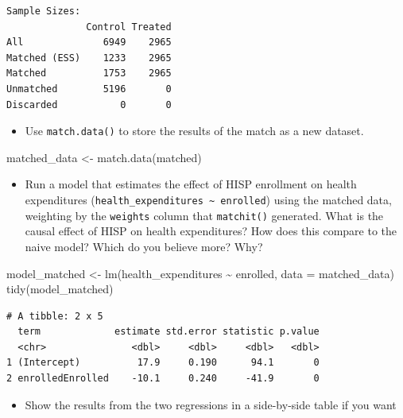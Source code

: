 \documentclass[
  letterpaper,
  DIV=11,
  numbers=noendperiod]{scrartcl}
\newenvironment{Shaded}{\begin{snugshade}}{\end{snugshade}}
\newcommand{\AttributeTok}[1]{\textcolor[rgb]{0.40,0.45,0.13}{#1}}
\newcommand{\FunctionTok}[1]{\textcolor[rgb]{0.28,0.35,0.67}{#1}}
\newcommand{\NormalTok}[1]{\textcolor[rgb]{0.00,0.23,0.31}{#1}}
\newcommand{\OtherTok}[1]{\textcolor[rgb]{0.00,0.23,0.31}{#1}}
\newcommand{\SpecialCharTok}[1]{\textcolor[rgb]{0.37,0.37,0.37}{#1}}
\providecommand{\tightlist}{%
  \setlength{\itemsep}{0pt}\setlength{\parskip}{0pt}}\usepackage{longtable,booktabs,array}
\begin{document}
\begin{verbatim}
Sample Sizes:
              Control Treated
All              6949    2965
Matched (ESS)    1233    2965
Matched          1753    2965
Unmatched        5196       0
Discarded           0       0
\end{verbatim}

\begin{itemize}
\tightlist
\item
  Use \texttt{match.data()} to store the results of the match as a new
  dataset.
\end{itemize}

\begin{Shaded}
\begin{Highlighting}[numbers=left,,]
\NormalTok{matched\_data }\OtherTok{\textless{}{-}} \FunctionTok{match.data}\NormalTok{(matched)}
\end{Highlighting}
\end{Shaded}

\begin{itemize}
\tightlist
\item
  Run a model that estimates the effect of HISP enrollment on health
  expenditures
  (\texttt{health\_expenditures\ \textasciitilde{}\ enrolled}) using the
  matched data, weighting by the \texttt{weights} column that
  \texttt{matchit()} generated. What is the causal effect of HISP on
  health expenditures? How does this compare to the naive model? Which
  do you believe more? Why?
\end{itemize}

\begin{Shaded}
\begin{Highlighting}[numbers=left,,]
\NormalTok{model\_matched }\OtherTok{\textless{}{-}} \FunctionTok{lm}\NormalTok{(health\_expenditures }\SpecialCharTok{\textasciitilde{}}\NormalTok{ enrolled,}
                    \AttributeTok{data =}\NormalTok{ matched\_data)}
\FunctionTok{tidy}\NormalTok{(model\_matched)}
\end{Highlighting}
\end{Shaded}

\begin{verbatim}
# A tibble: 2 x 5
  term             estimate std.error statistic p.value
  <chr>               <dbl>     <dbl>     <dbl>   <dbl>
1 (Intercept)          17.9     0.190      94.1       0
2 enrolledEnrolled    -10.1     0.240     -41.9       0
\end{verbatim}

\begin{itemize}
\tightlist
\item
  Show the results from the two regressions in a side-by-side table if
  you want
\end{itemize}
\end{document}
